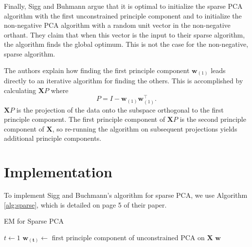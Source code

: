 \documentclass{article}
\begin{document}
Finally, Sigg and Buhmann argue that it is optimal to initialize
the sparse PCA algorithm with the first unconstrained principle component
and to initialize the non-negative PCA algorithm with a random unit vector
in the non-negative orthant.
They claim that when this vector is the input to their sparse algorithm,
the algorithm finds the global optimum.
This is not the case for the non-negative, sparse algorithm.

The authors explain how finding the first principle component
$\mathbf{w}_{(1)}$ leads directly to an iterative algorithm
for finding the others.
This is accomplished by calculating $\mathbf{X} P$
where \[ P = I - \mathbf{w}_{(1)} \mathbf{w}_{(1)}^\intercal \textrm{.} \]
$\mathbf{X}P$ is the projection of the data onto the subspace orthogonal
to the first principle component.
The first principle component of $\mathbf{X} P$ is the second
principle component of $\mathbf{X}$, so re-running the algorithm
on subsequent projections yields additional principle components.

\section{Implementation}

To implement Sigg and Buchmann's algorithm for sparse PCA,
we use Algorithm \ref{alg:sparse}, which is detailed on
page 5 of their paper.

\begin{algorithm}[h]\dontprintsemicolon
  \caption{EM for Sparse PCA}
  \label{alg:sparse}
  $t \leftarrow 1$ \;
  $\mathbf{w_{(t)}} \leftarrow$ first principle component
  of unconstrained PCA on $\mathbf{X}$ \;
  \Return $\mathbf{w}$
\end{algorithm}
\end{document}
